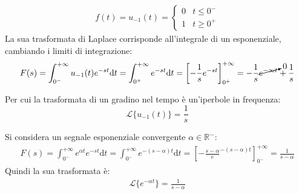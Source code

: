 \documentclass{article}
\newcommand{\df}{\mathrm{d}}
\numberwithin{equation}{subsection}
\begin{document}
\begin{gather*}
    f(t)=u_{-1}(t)=\begin{cases}
        0&t\leq 0^-\\
        1&t\geq 0^+
    \end{cases}
\end{gather*}
La sua trasformata di Laplace corrisponde all'integrale di un esponenziale, cambiando i limiti di integrazione:
\begin{gather*}
    F(s)=\displaystyle\int_{0^-}^{+\infty}u_{-1}(t)e^{-st}\df t=\int_{0^+}^{+\infty}e^{-st}\df t=\left[-\frac{1}{s}e^{-st}\right]_{0^+}^{+\infty}=-\frac{1}{s}\cancelto{0}{e^{-\infty t}}+\frac{1}{s}
\end{gather*}

Per cui la trasformata di un gradino nel tempo è un'iperbole in frequenza:
\begin{equation}
    \mathcal{L}\{u_{-1}(t)\}=\displaystyle\frac{1}{s}
\end{equation}

Si considera un segnale esponenziale convergente $\alpha\in\mathbb{R}^-$:
\begin{gather*}
    F(s)=\displaystyle\int_{0^-}^{+\infty}e^{\alpha t}e^{-st}\df t=\int_{0^-}^{+\infty}e^{-(s-\alpha)t}\df t=\left[-\frac{s-\alpha}e^{-(s-\alpha)t}\right]^{+\infty}_{0^-}=\frac{1}{s-\alpha}
\end{gather*}
Quindi la sua trasformata è:
\begin{gather}
    \mathcal{L}\{e^{-\alpha t}\}=\displaystyle\frac{1}{s-\alpha}
\end{gather}
\end{document}
